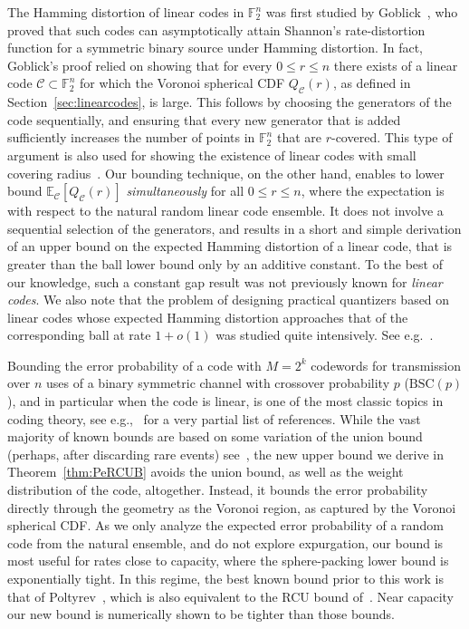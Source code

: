 \documentclass[article,doublecolumn]{IEEEtran}
\newcommand{\F}{{\mathbb{F}}}
\newcommand{\EE}{{\mathbb{E}}}
\newcommand{\CC}{{\mathcal{C}}}
\begin{document}
The Hamming distortion of linear codes in $\F_2^n$ was first studied by Goblick~\cite{goblick1963coding}, who proved that such codes can asymptotically attain Shannon's rate-distortion function for a symmetric binary source under Hamming distortion. In fact, Goblick's proof relied on showing that for every $0\leq r\leq n$ there exists of a linear code $\CC\subset\F_2^n$ for which the Voronoi spherical CDF $Q_\CC(r)$, as defined in Section~\ref{sec:linearcodes}, is large. This follows by choosing the generators of the code sequentially, and ensuring that every new generator that is added sufficiently increases the number of points in $\F_2^n$ that are $r$-covered. This type of argument is also used for showing the existence of linear codes with small covering radius~\cite{cohen1997covering}. Our bounding technique, on the other hand, enables to lower bound $\EE_\CC[Q_{\CC}(r)]$ \emph{simultaneously} for all $0\leq r\leq n$, where the expectation is with respect to the natural random linear code ensemble. It does not involve a sequential selection of the generators, and results in a short and simple derivation of an upper bound on the expected Hamming distortion of a linear code, that is greater than the ball lower bound only by an additive constant. To the best of our knowledge, such a constant gap result was not previously known for \emph{linear codes}. We also note that the problem of designing practical quantizers based on linear codes whose expected Hamming distortion approaches that of the corresponding ball at rate $1+o(1)$ was studied quite intensively. See e.g.~\cite{viterbi1974trellis,matsunaga2003coding,wainwright2010lossy,korada2010polar,mazumdar2015local}. 

\medskip

Bounding the error probability of a code with $M=2^k$ codewords for transmission over $n$ uses of a binary symmetric channel with crossover probability $p$ ($\mathrm{BSC}(p)$), and in particular when the code is linear, is one of the most classic topics in coding theory, see e.g.,~\cite{gallager1968information,poltyrev94,barg2002random,ppv10} for a very partial list of references. While the vast majority of known bounds are based on some variation of the union bound (perhaps, after discarding rare events) see~\cite[Chapter 1]{sason2006performance}, the new upper bound we derive in Theorem~\ref{thm:PeRCUB} avoids the union bound, as well as the weight distribution of the code, altogether. Instead, it bounds the error probability directly through the geometry as the Voronoi region, as captured by the Voronoi spherical CDF. As we only analyze the expected error probability of a random code from the natural ensemble, and do not explore expurgation, our bound is most useful for rates close to capacity, where the sphere-packing lower bound is exponentially tight. In this regime, the best known bound prior to this work is that of Poltyrev~\cite{poltyrev94}, which is also equivalent to the RCU bound of~\cite{ppv10}. Near capacity our new bound is numerically shown to be tighter than those bounds.
\end{document}
